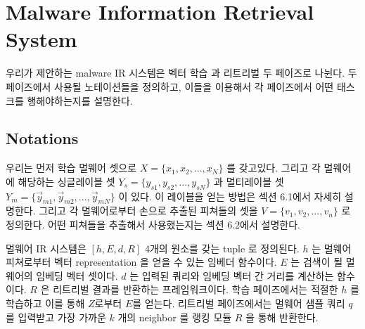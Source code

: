 \section{Malware Information Retrieval System}

우리가 제안하는 malware IR 시스템은 벡터 학습 과 리트리벌 두 페이즈로 나뉜다. 두 페이즈에서 사용될 노테이션들을 정의하고, 이들을 이용해서 각 페이즈에서 어떤 태스크를 행해야하는지를 설명한다. 


\subsection{Notations}

우리는 먼저 학습 멀웨어 셋으로 $X = \{x_1, x_2, ..., x_N\}$ 를 갖고있다. 그리고 각 멀웨어에 해당하는 싱글레이블 셋 $Y_s = \{y_{s1}, y_{s2}, ..., y_{sN}\}$ 과 멀티레이블 셋 $Y_m = \{\vec{y}_{m1}, \vec{y}_{m2}, ... , \vec{y}_{mN}\}$ 이 있다. 이 레이블을 얻는 방법은 섹션 6.1에서 자세히 설명한다. 그리고 각 멀웨어로부터 손으로 추출된 피쳐들의 셋을 $V = \{v_1, v_2, ..., v_n \}$ 로 정의한다. 어떤 피쳐들을 추출해서 사용했는지는 섹션 6.2에서 설명한다. 

멀웨어 IR 시스템은 $[h, E, d, R]$ 4개의 원소를 갖는 tuple 로 정의된다. $h$ 는 멀웨어 피쳐로부터 벡터 representation 을 얻을 수 있는 임베더 함수이다. $E$ 는 검색이 될 멀웨어의 임베딩 벡터 셋이다. $d$ 는 입력된 쿼리와 임베딩 벡터 간 거리를 계산하는 함수이다. $R$ 은 리트리벌 결과를 반환하는 프레임워크이다. 학습 페이즈에서는 적절한 $h$ 를 학습하고 이를 통해 $Z$로부터 $E$를 얻는다. 리트리벌 페이즈에서는 멀웨어 샘플 쿼리 $q$ 를 입력받고 가장 가까운 $k$ 개의 neighbor 를 랭킹 모듈 $R$ 을 통해 반환한다.

